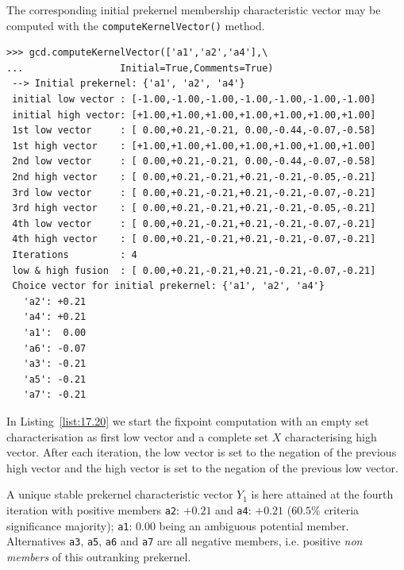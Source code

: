 The corresponding initial prekernel membership characteristic vector may be computed with the \texttt{computeKernelVector()} method.
\begin{lstlisting}[caption={Fixpoint iterations for initial prekernel \texttt{\{a1, a2, a4\}}},label=list:17.20,basicstyle=\ttfamily\scriptsize]
>>> gcd.computeKernelVector(['a1','a2','a4'],\
...                 Initial=True,Comments=True)
 --> Initial prekernel: {'a1', 'a2', 'a4'}
 initial low vector : [-1.00,-1.00,-1.00,-1.00,-1.00,-1.00,-1.00]
 initial high vector: [+1.00,+1.00,+1.00,+1.00,+1.00,+1.00,+1.00]
 1st low vector     : [ 0.00,+0.21,-0.21, 0.00,-0.44,-0.07,-0.58]
 1st high vector    : [+1.00,+1.00,+1.00,+1.00,+1.00,+1.00,+1.00]
 2nd low vector     : [ 0.00,+0.21,-0.21, 0.00,-0.44,-0.07,-0.58]
 2nd high vector    : [ 0.00,+0.21,-0.21,+0.21,-0.21,-0.05,-0.21]
 3rd low vector     : [ 0.00,+0.21,-0.21,+0.21,-0.21,-0.07,-0.21]
 3rd high vector    : [ 0.00,+0.21,-0.21,+0.21,-0.21,-0.05,-0.21]
 4th low vector     : [ 0.00,+0.21,-0.21,+0.21,-0.21,-0.07,-0.21]
 4th high vector    : [ 0.00,+0.21,-0.21,+0.21,-0.21,-0.07,-0.21]
 Iterations         : 4
 low & high fusion  : [ 0.00,+0.21,-0.21,+0.21,-0.21,-0.07,-0.21]
 Choice vector for initial prekernel: {'a1', 'a2', 'a4'}
   'a2': +0.21
   'a4': +0.21
   'a1':  0.00
   'a6': -0.07
   'a3': -0.21
   'a5': -0.21
   'a7': -0.21
\end{lstlisting}

In Listing~\vref{list:17.20} we start the fixpoint computation with an empty set characterisation as first low vector and a complete set $X$ characterising high vector. After each iteration, the low vector is set to the negation of the previous high vector and the high vector is set to the negation of the previous low vector.

A unique stable prekernel characteristic vector $Y_1$ is here attained at the fourth iteration with positive members \texttt{a2}: $+0.21$ and \texttt{a4}: $+0.21$ ($60.5\%$ criteria significance majority); \texttt{a1}: $0.00$ being an ambiguous potential member. Alternatives \texttt{a3}, \texttt{a5}, \texttt{a6} and \texttt{a7} are all negative members, i.e. positive \emph{non members} of this outranking prekernel.

